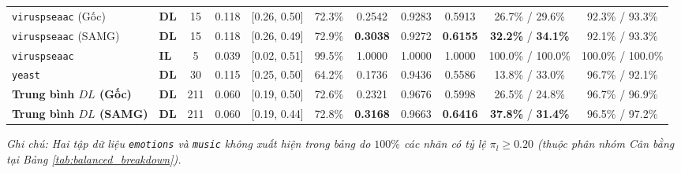 \documentclass[10pt,a4paper]{article}
\begin{document}
\begin{table}[H]
{\begin{tabular}{llccccccccc}
\texttt{viruspseaac} (Gốc)      & \textbf{DL} & 15  & 0.118 & [0.26, 0.50] & 72.3\% & 0.2542 & 0.9283 & 0.5913 & 26.7\% / 29.6\% & 92.3\% / 93.3\% \\
\texttt{viruspseaac} (SAMG)     & \textbf{DL} & 15  & 0.118 & [0.26, 0.49] & 72.9\% & \textbf{0.3038} & 0.9272 & \textbf{0.6155} & \textbf{32.2\%} / \textbf{34.1\%} & 92.1\% / 93.3\% \\
\texttt{viruspseaac}            & \textbf{IL} & 5   & 0.039 & [0.02, 0.51] & 99.5\% & 1.0000 & 1.0000 & 1.0000 & 100.0\% / 100.0\%& 100.0\% / 100.0\%\\
\texttt{yeast}                  & \textbf{DL} & 30  & 0.115 & [0.25, 0.50] & 64.2\% & 0.1736 & 0.9436 & 0.5586 & 13.8\% / 33.0\% & 96.7\% / 92.1\% \\
\midrule
\textbf{Trung bình $DL$ (Gốc)}  & \textbf{DL} & 211 & 0.060 & [0.19, 0.50] & 72.6\% & 0.2321 & 0.9676 & 0.5998 & 26.5\% / 24.8\% & 96.7\% / 96.9\% \\
\textbf{Trung bình $DL$ (SAMG)} & \textbf{DL} & 211 & 0.060 & [0.19, 0.44] & 72.8\% & \textbf{0.3168} & 0.9663 & \textbf{0.6416} & \textbf{37.8\%} / \textbf{31.4\%} & 96.5\% / 97.2\% \\
\bottomrule
\end{tabular}%
}
\vspace{1mm}
\raggedright \footnotesize \textit{Ghi chú: Hai tập dữ liệu \texttt{emotions} và \texttt{music} không xuất hiện trong bảng do $100\%$ các nhãn có tỷ lệ $\pi_l \ge 0.20$ (thuộc phân nhóm Cân bằng tại Bảng \ref{tab:balanced_breakdown}).}
\end{table}
\end{document}
